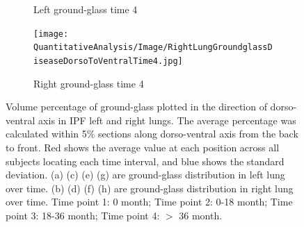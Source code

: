 \begin{figure}[H]
\begin{subfigure}{.41\linewidth}
  \caption{Left ground-glass time 4}
  \label{fig:DiseaseADorsoToVentralOverTime1-g} 
\end{subfigure} 
\begin{subfigure}{.41\linewidth}%
  \texttt{[image: QuantitativeAnalysis/Image/RightLungGroundglassDiseaseDorsoToVentralTime4.jpg]}
  \caption{Right ground-glass time 4}
  \label{fig:DiseaseADorsoToVentralOverTime1-h}
\end{subfigure}
\caption{Volume percentage of ground-glass plotted in the direction of dorso-ventral axis in IPF left and right lungs. The average percentage was calculated within 5\% sections along dorso-ventral axis from the back to front. Red shows the average value at each position across all subjects locating each time interval, and blue shows the standard deviation. (a) (c) (e) (g) are ground-glass distribution in left lung over time. (b) (d) (f) (h) are ground-glass distribution in right lung over time. Time point 1: 0 month; Time point 2: 0-18 month; Time point 3: 18-36 month; Time point 4: $>$ 36 month.}
\label{fig:DiseaseADorsoToVentralOverTime1}
\end{figure}

